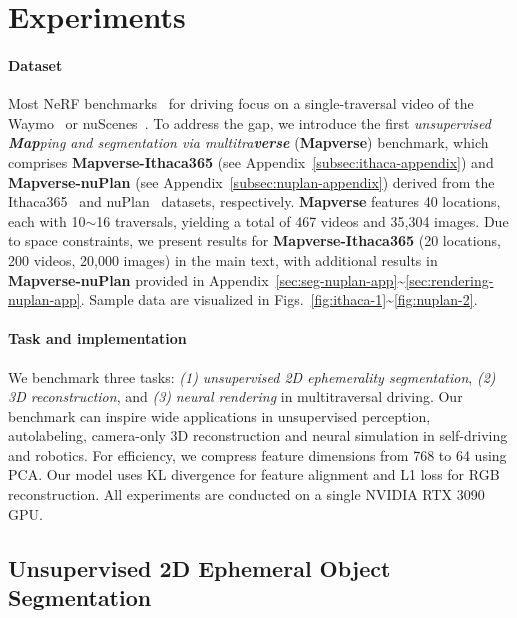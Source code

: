 \section{Experiments}
\paragraph{Dataset} Most NeRF benchmarks~\cite{guo2023streetsurf,yang2023emernerf,yan2024street} for driving focus on a single-traversal video of the Waymo~\cite{sun2020scalability} or nuScenes~\cite{caesar2020nuscenes}. To address the gap, we introduce the first \textit{unsupervised \textbf{Map}ping and segmentation via multitra\textbf{verse}} (\textbf{Mapverse}) benchmark, which comprises \textbf{Mapverse-Ithaca365} (see Appendix~\ref{subsec:ithaca-appendix}) and \textbf{Mapverse-nuPlan} (see Appendix~\ref{subsec:nuplan-appendix}) derived from the Ithaca365~\cite{diaz2022ithaca365} and nuPlan~\cite{karnchanachari2024towards} datasets, respectively. \textbf{Mapverse} features 40 locations, each with 10$\sim$16 traversals, yielding a total of 467 videos and 35,304 images. Due to space constraints, we present results for \textbf{Mapverse-Ithaca365} (20 locations, 
 200 videos, 20,000 images) in the main text, with additional results in \textbf{Mapverse-nuPlan} provided in Appendix~\ref{sec:seg-nuplan-app}\textasciitilde\ref{sec:rendering-nuplan-app}. Sample data are visualized in Figs.~\ref{fig:ithaca-1}\textasciitilde\ref{fig:nuplan-2}.

\paragraph{Task and implementation} We benchmark three tasks: \emph{(1)} \textit{{unsupervised 2D ephemerality segmentation}}, \emph{(2)} \textit{{3D reconstruction}}, and \emph{(3)} \textit{{neural rendering}} in multitraversal driving. Our benchmark can inspire wide applications in unsupervised perception, autolabeling, camera-only 3D reconstruction and neural simulation in self-driving and robotics. For efficiency, we compress feature dimensions from 768 to 64 using PCA. Our model uses KL divergence for feature alignment and L1 loss for RGB reconstruction. All experiments are conducted on a single NVIDIA RTX 3090 GPU.

\subsection{Unsupervised 2D Ephemeral Object Segmentation}
